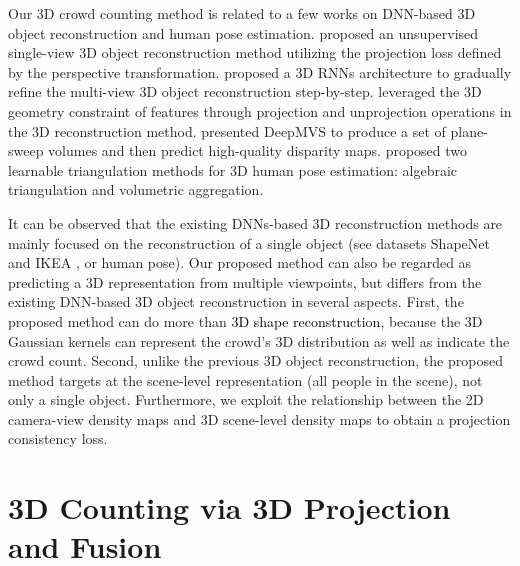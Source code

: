 \documentclass[letterpaper]{article} %
\newcommand{\zq}[1]{\textcolor{black}{#1}} %
\newcommand{\citep}{\cite}
\newcommand{\citealp}[1]{\citeauthor{#1} \citeyear{#1}}
\begin{document}
Our 3D crowd counting method is related to a few works on DNN-based 3D object reconstruction and human pose estimation. \citealp{yan2016perspective} proposed an unsupervised single-view 3D object reconstruction method utilizing the projection loss defined by the perspective transformation.
\citealp{choy20163d} proposed a 3D RNNs architecture to gradually refine the multi-view 3D object reconstruction step-by-step.
\citealp{kar2017learning} leveraged the 3D geometry constraint of features through projection and unprojection operations in the 3D reconstruction method.
\citealp{huang2018deepmvs} presented DeepMVS to %
 produce a set of plane-sweep volumes and then predict high-quality disparity maps.
\citealp{Iskakov2019Learnable} proposed two learnable triangulation methods for 3D human pose estimation: algebraic triangulation and volumetric aggregation.

\par
It can be observed that the existing DNNs-based 3D reconstruction methods are mainly focused on the reconstruction of a single object (see datasets ShapeNet \citep{chang2015shapenet} and IKEA \citep{lpt2013ikea}, or human pose). Our proposed method can also be regarded as predicting a 3D representation from multiple viewpoints, but differs from the existing DNN-based 3D object reconstruction in several aspects. First, the proposed method can do more than \zq{3D shape reconstruction}, because the 3D Gaussian kernels can represent the crowd's 3D distribution as well as indicate the crowd count. Second, unlike the previous 3D object reconstruction, the proposed method targets at the scene-level representation (all people in the scene), not only a single object. Furthermore, we exploit the relationship between the 2D camera-view density maps and 3D scene-level density maps to obtain a projection consistency loss.



\section{3D Counting via 3D Projection and Fusion}
\end{document}
